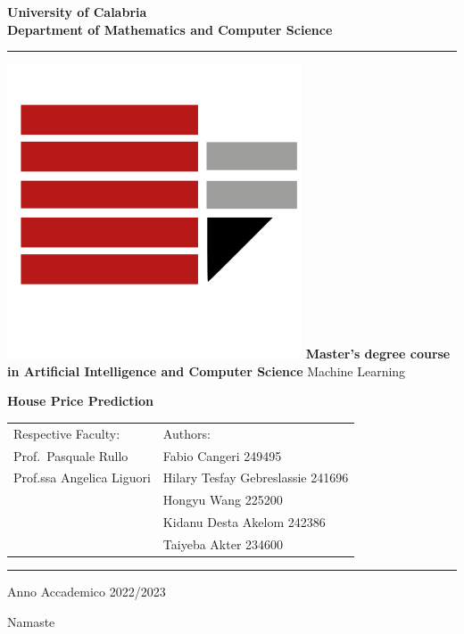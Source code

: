 \documentclass[a4paper,12pt]{report}
\newenvironment{dedication}
  {\clearpage           %
   \thispagestyle{empty}%
   \vspace*{\stretch{1}}%
   \itshape             %
   \raggedleft          %
  }
   {\par %
   \vspace{\stretch{3}} %
   \clearpage           %
  }
\begin{document}
\begin{titlepage}
\begin{center}
\textbf{\LARGE University of Calabria}\\
\textbf{Department of Mathematics and Computer Science}\\
\vskip 6pt
\hrule
\vskip 8pt
\includegraphics[width=0.13\linewidth]{logo.png}
\vskip 8pt
\textbf{Master’s degree course in Artificial Intelligence and Computer Science}
\vskip 32pt
Machine Learning

\vskip 70pt
{ \huge \bfseries 
    House Price Prediction  
}\\[0.4cm]
\vskip 150pt

\begin{tabular}{p{8cm}p{8cm}}
Respective Faculty: & Authors:\\
Prof.~Pasquale Rullo & Fabio Cangeri 249495 \\
Prof.ssa Angelica Liguori & Hilary Tesfay Gebreslassie 241696 \\
 & Hongyu Wang 225200 \\
 & Kidanu Desta Akelom 242386 \\
 & Taiyeba Akter 234600 \\
\end{tabular}


\vskip 60pt
\hrule
\vskip 6pt
Anno Accademico 2022/2023
\vfill
\end{center}

\end{titlepage}

\begin{dedication}
Namaste
\end{dedication}




\tableofcontents






\end{document}
